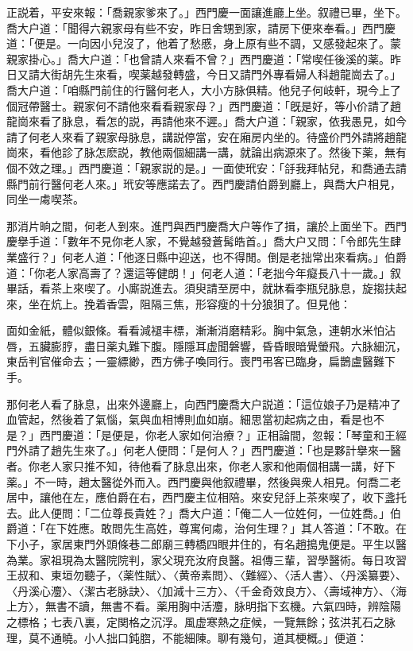 正説着，平安來報：「喬親家爹來了。」西門慶一面讓進廳上坐。叙禮已畢，坐下。喬大户道：「聞得六親家母有些不安，昨日舍甥到家，請房下便來奉看。」西門慶道：「便是。一向因小兒沒了，他着了愁慼，身上原有些不調，又感發起來了。蒙親家掛心。」喬大户道：「也曾請人來看不曾？」西門慶道：「常喫任後溪的薬。昨日又請大街胡先生來看，喫薬越發轉盛，今日又請門外專看婦人科趙龍崗去了。」喬大户道：「咱縣門前住的行醫何老人，大小方脉俱精。他兒子何岐軒，現今上了個冠帶醫士。親家何不請他來看看親家母？」西門慶道：「旣是好，等小价請了趙龍崗來看了脉息，看怎的説，再請他來不遲。」喬大户道：「親家，依我愚見，如今請了何老人來看了親家母脉息，講説停當，安在廂房内坐的。待盛价門外請將趙龍崗來，看他診了脉怎麽説，教他兩個細講一講，就論出病源來了。然後下薬，無有個不效之理。」西門慶道：「親家説的是。」一面使玳安：「㧱我拜帖兒，和喬通去請縣門前行醫何老人來。」玳安等應諾去了。西門慶請伯爵到廳上，與喬大户相見，同坐一䖏喫茶。

那消片晌之間，何老人到來。進門與西門慶喬大户等作了揖，讓於上面坐下。西門慶擧手道：「數年不見你老人家，不覺越發蒼髯皓首。」喬大户又問：「令郎先生肆業盛行？」何老人道：「他逐日縣中迎送，也不得閒。倒是老拙常出來看病。」伯爵道：「你老人家高壽了？還這等健朗！」何老人道：「老拙今年癡長八十一歲。」叙畢話，看茶上來喫了。小廝説進去。須臾請至房中，就牀看李瓶兒脉息，旋搊扶起來，坐在炕上。挽着香雲，阻隔三焦，形容瘦的十分狼狽了。但見他：

面如金紙，體似銀條。看看減褪丰標，漸漸消磨精彩。胸中氣急，連朝水米怕沾唇，五臟膨脝，盡日薬丸難下腹。隱隱耳虚聞磐響，昏昏眼暗覺螢飛。六脉細沉，東岳判官催命去；一靈縹緲，西方佛子喚同行。喪門弔客已臨身，扁鵲盧醫難下手。

那何老人看了脉息，出來外邊廳上，向西門慶喬大户説道：「這位娘子乃是精冲了血管起，然後着了氣惱，氣與血相博則血如崩。細思當初起病之由，看是也不是？」西門慶道：「是便是，你老人家如何治療？」正相論間，忽報：「琴童和王經門外請了趙先生來了。」何老人便問：「是何人？」西門慶道：「也是夥計擧來一醫者。你老人家只推不知，待他看了脉息出來，你老人家和他兩個相講一講，好下薬。」不一時，趙太醫從外而入。西門慶與他叙禮畢，然後與衆人相見。何喬二老居中，讓他在左，應伯爵在右，西門慶主位相陪。來安兒㧱上茶來喫了，收下盞托去。此人便問：「二位尊長貴姓？」喬大户道：「俺二人一位姓何，一位姓喬。」伯爵道：「在下姓應。敢問先生高姓，尊寓何䖏，治何生理？」其人答道：「不敢。在下小子，家居東門外頭條巷二郎廟三轉橋四眼井住的，有名趙搗鬼便是。平生以醫為業。家祖現為太醫院院判，家父現充汝府良醫。祖傳三輩，習學醫術。每日攻習王叔和、東垣勿聽子，〈薬性賦〉、〈黄帝素問〉、〈難經〉、〈活人書〉、〈丹溪纂要〉、〈丹溪心灋〉、〈潔古老脉訣〉、〈加減十三方〉、〈千金奇效良方〉、〈壽域神方〉、〈海上方〉，無書不讀，無書不看。薬用胸中活灋，脉明指下玄機。六氣四時，辨陰陽之標格；七表八裏，定関格之沉浮。風虚寒熱之症候，一覽無餘；弦洪芤石之脉理，莫不通曉。小人拙口鈍脗，不能細陳。聊有幾句，道其梗概。」便道：

